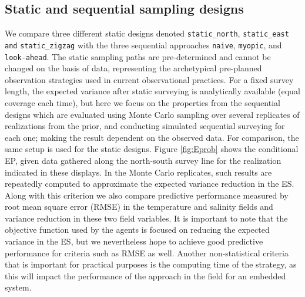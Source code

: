\documentclass[aoas]{imsart}
\begin{document}
\newpage
\subsection{Static and sequential sampling designs}\label{sec:sampling_designs}


We compare three different static designs denoted \texttt{static\_north}, \texttt{static\_east and} \texttt{static\_zigzag} with the three sequential approaches \texttt{naive}, \texttt{myopic}, and \texttt{look-ahead}. The static sampling paths are pre-determined and cannot be changed on the basis of data, representing the archetypical pre-planned observation strategies used in current observational practices. For a fixed survey length, the expected variance after static surveying is analytically available (equal coverage each time), but here we focus on the properties from the sequential designs which are evaluated using Monte Carlo sampling over several replicates of realizations from the prior, and conducting simulated sequential surveying for each one; making the result dependent on the observed data. For comparison, the same setup is used for the static designs. Figure \ref{fig:Eprob} shows the conditional EP, given data gathered along the north-south survey line for the realization indicated in these displays. In the Monte Carlo replicates, such results are repeatedly computed to approximate the expected variance reduction in the ES. Along with this criterion we also compare predictive performance measured by root mean square error (RMSE) in the temperature and salinity fields and variance reduction in these two field variables. It is important to note that the objective function used by the agents is focused on reducing the expected variance in the ES, but we nevertheless hope to achieve good predictive performance for criteria such as RMSE as well. Another non-statistical criteria that is important for practical purposes is the computing time of the strategy, as this will impact the performance of the approach in the field for an embedded system. 
\end{document}
